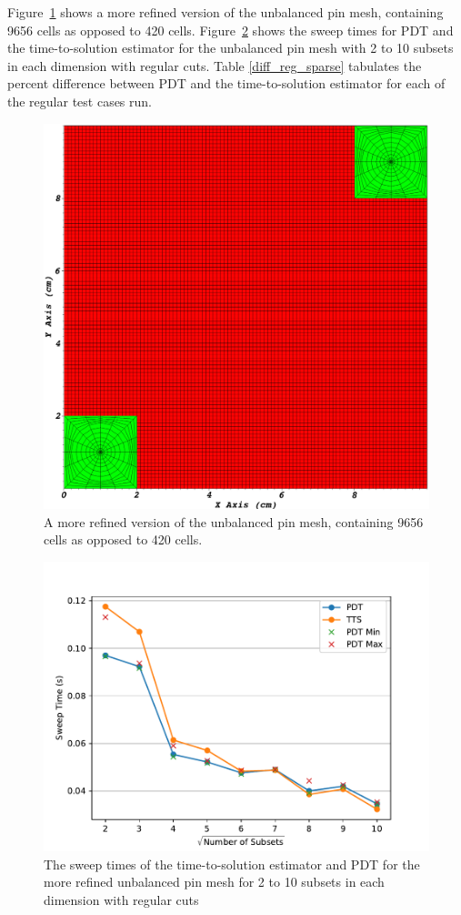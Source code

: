 \documentclass[times,final]{elsarticle}
\begin{document}
\FloatBarrier
Figure~\ref{ubp_more_sparse} shows a more refined version of the unbalanced pin mesh, containing 9656 cells as opposed to 420 cells. 
Figure~\ref{comp_reg_sparse} shows the sweep times for PDT and the time-to-solution estimator for the unbalanced pin mesh with 2 to 10 subsets in each dimension with regular cuts.
Table \ref{diff_reg_sparse} tabulates the percent difference between PDT and the time-to-solution estimator for each of the regular test cases run.
\begin{figure}[H]
\centering
\includegraphics[scale=0.28]{../figures/unbalanced_pins_more_sparse.png}
\caption{A more refined version of the unbalanced pin mesh, containing 9656 cells as opposed to 420 cells.}
\label{ubp_more_sparse}
\end{figure}
\begin{figure}[h]
\centering
\includegraphics{../figures/more_sparse_reg_pdtvtts.pdf}
\caption{The sweep times of the time-to-solution estimator and PDT for the more refined unbalanced pin mesh for 2 to 10 subsets in each dimension with regular cuts}
\label{comp_reg_sparse}
\end{figure}
\end{document}
